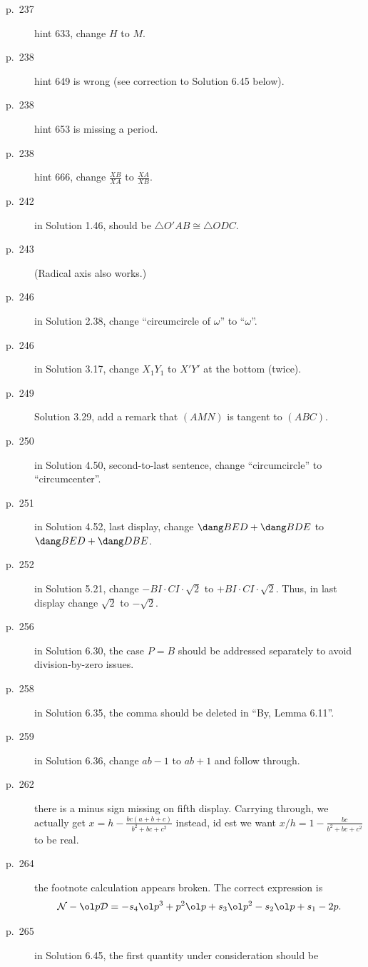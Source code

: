 \documentclass[11pt]{scrartcl}
\begin{document}
\begin{description}
\item[p.\  237] hint 633, change $H$ to $M$.
\item[p.\  238] hint 649 is wrong (see correction to Solution 6.45 below).
\item[p.\  238] hint 653 is missing a period.
\item[p.\  238] hint 666, change $\frac{XB}{XA}$ to $\frac{XA}{XB}$.
\item[p.\  242] in Solution 1.46, should be $\triangle O'AB \cong \triangle ODC$.
\item[p.\  243] 
  (Radical axis also works.)
\item[p.\  246] in Solution 2.38, change ``circumcircle of $\omega$'' to ``$\omega$''.
\item[p.\  246] in Solution 3.17, change $X_1Y_1$ to $X'Y'$ at the bottom (twice).
\item[p.\  249] Solution 3.29, add a remark that $(AMN)$ is tangent to $(ABC)$.
\item[p.\  250] in Solution 4.50, second-to-last sentence,
  change ``circumcircle'' to ``circumcenter''.
\item[p.\  251] in Solution 4.52, last display,
  change $\dang BED + \dang BDE$ to $\dang BED + \dang DBE$.
\item[p.\  252] in Solution 5.21, change $-BI \cdot CI \cdot \sqrt2$ to $+ BI \cdot CI \cdot \sqrt2$.
  Thus, in last display change $\sqrt2$ to $-\sqrt2$.
\item[p.\  256] in Solution 6.30, the case $P=B$ should be addressed separately
  to avoid division-by-zero issues.
\item[p.\  258] in Solution 6.35, the comma should be deleted in ``By, Lemma 6.11''.
\item[p.\  259] in Solution 6.36, change $ab-1$ to $ab+1$ and follow through.
\item[p.\  262] there is a minus sign missing on fifth display.
  Carrying through, we actually get $x = h - \frac{bc(a+b+c)}{b^2+bc+c^2}$ instead,
  id est we want $x/h = 1 - \frac{bc}{b^2+bc+c^2}$ to be real.
\item[p.\  264] the footnote calculation appears broken. The correct expression is
  \[ \mathcal{N} - \ol p \mathcal{D}
    = -s_4 \ol p^3 + p^2 \ol p + s_3 \ol p^2 - s_2 \ol p + s_1 - 2 p.  \]
\item[p.\  265] in Solution 6.45, the first quantity under consideration should be

\end{description}
\end{document}
